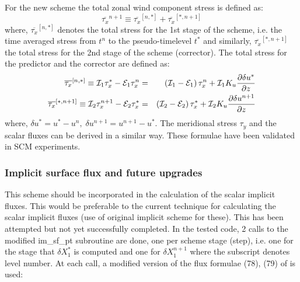 \documentclass{UMDP_article}
\begin{document}
For the new scheme the total zonal wind component stress is defined
as:
\begin{equation*}
  \overline{\tau_{x}}^{n+1}\equiv\overline{\tau_{x}}^{[n,*]}+\overline{\tau_{x}}^{[*,n+1]}
\end{equation*}
where, $\overline{\tau_{x}}^{[n,*]}$ denotes the total stress for the
1st stage of the scheme, i.e. the time averaged stress from $t^{n}$ to
the pseudo-timelevel $t^{*}$ and similarly,
$\overline{\tau_{x}}^{[*,n+1]}$ the total stress for the 2nd stage of
the scheme (corrector). The total stress for the predictor and the
corrector are defined as:
\begin{eqnarray*}
  \overline{\tau_{x}}^{[n,*]}\equiv{\cal I}_{1}\tau_{x}^{*}-{\cal E}_{1}\tau_{x}^{n} & = & \left({\cal I}_{1}-{\cal E}_{1}\right)\tau_{x}^{n}+{\cal I}_{1}K_{u}\frac{\partial\delta u^{*}}{\partial z}\\
  \overline{\tau_{x}}^{[*,n+1]}\equiv{\cal I}_{2}\tau_{x}^{n+1}-{\cal E}_{2}\tau_{x}^{*} & = & \left({\cal I}_{2}-{\cal E}_{2}\right)\tau_{x}^{*}+{\cal I}_{2}K_{u}\frac{\partial\delta u^{n+1}}{\partial z}
\end{eqnarray*}
where, $\delta u^{*}=u^{*}-u^{n},\;\delta u^{n+1}=u^{n+1}-u^{*}$.  The
meridional stress $\tau_{y}$ and the scalar fluxes can be derived in a
similar way. These formulae have been validated in SCM experiments.

\subsubsection{Implicit surface flux and future upgrades}

This scheme should be incorporated in the calculation of the scalar
implicit fluxes. This would be preferable to the current technique for
calculating the scalar implicit fluxes (use of original implicit
scheme for these). This has been attempted but not yet successfully
completed. In the tested code, 2 calls to the modified im\_sf\_pt
subroutine are done, one per scheme stage (step), i.e. one for the
stage that ${\delta X}_{1}^{*}$ is computed and one for $\delta
X_{1}^{n+1}$ where the subscript denotes level number. At each call, a
modified version of the flux formulae (78), (79) of
\cite{esseryetal2001} is used:
\end{document}
